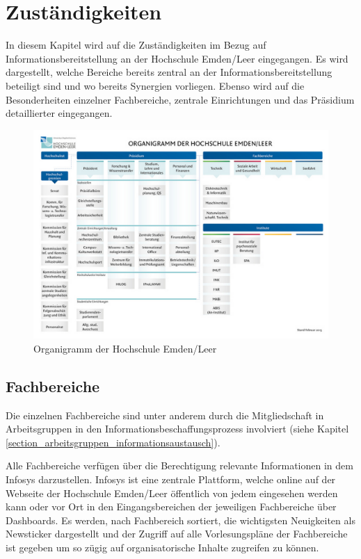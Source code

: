 \section{Zuständigkeiten}
In diesem Kapitel wird auf die Zuständigkeiten im Bezug auf Informationsbereitstellung an der Hochschule Emden/Leer eingegangen. Es wird dargestellt, welche Bereiche bereits zentral an der Informationsbereitstellung beteiligt sind und wo bereits Synergien vorliegen. Ebenso wird auf die Besonderheiten einzelner Fachbereiche, zentrale Einrichtungen und das Präsidium detaillierter eingegangen. 

\begin{figure}[h!]
	\centering
	\includegraphics[width=14cm]{kapitel/gruppe2/bilder/organigramm_HS}
	\caption{Organigramm der Hochschule Emden/Leer}
	\label{fig_organigramm_HS}
\end{figure}


\subsection{Fachbereiche}
Die einzelnen Fachbereiche sind unter anderem durch die Mitgliedschaft in Arbeitsgruppen in den Informationsbeschaffungsprozess involviert (siehe Kapitel \ref{section_arbeitsgruppen_informationsaustausch}). 

Alle Fachbereiche verfügen über die Berechtigung relevante Informationen in dem Infosys darzustellen. Infosys ist eine zentrale Plattform, welche online auf der Webseite der Hochschule Emden/Leer öffentlich von jedem eingesehen werden kann oder vor Ort  in den Eingangsbereichen der jeweiligen Fachbereiche über Dashboards. Es werden, nach Fachbereich sortiert, die wichtigsten Neuigkeiten als Newsticker dargestellt und der Zugriff auf alle Vorlesungspläne der Fachbereiche ist gegeben um so zügig auf organisatorische Inhalte zugreifen zu können.

